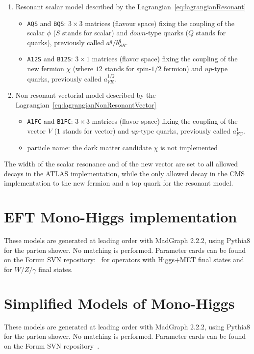 \begin{enumerate}

\item Resonant scalar model described by the Lagrangian~\eqref{eq:lagrangianResonant}
  \begin{itemize}
  \item \texttt{AQS} and \texttt{BQS}: $3\times 3$ matrices (flavour space) fixing the coupling of the scalar $\phi$ ($S$ stands for scalar) and $down$-type quarks ($Q$ stands for quarks), previously called $a^q/b^q_{SR}$.
  \item \texttt{A12S} and \texttt{B12S}: $3\times 1$ matrices (flavor space) fixing the coupling of the new fermion $\chi$ (where $12$ stands for spin-$1/2$ fermion) and $up$-type quarks, previously called $a^{1/2}_{VR}$.
  \end{itemize}  
  
\item Non-resonant vectorial model described by the Lagrangian~\eqref{eq:lagrangianNonResonantVector}
\begin{itemize}
\item \texttt{A1FC} and \texttt{B1FC}: $3\times 3$ matrices (flavor space) fixing the coupling of the vector $V$ ($1$ stands for vector) and $up$-type quarks, previously called $a^1_{FC}$. 
\item particle name: the dark matter candidate $\chi$ is not implemented %
\end{itemize}

\end{enumerate}

The width of the scalar resonance and of the new vector are set to all allowed decays in the ATLAS implementation,
while the only allowed decay in the CMS implementation to the new fermion and a top quark for the resonant model. 

\section{EFT Mono-Higgs implementation}

These models are generated at leading
order with MadGraph 2.2.2, using Pythia8 for the parton shower. No matching is performed. 
Parameter cards can be found on the Forum SVN repository:~\cite{ForumSVN_EWMonoHiggs} for operators with Higgs+MET final states
and ~\cite{ForumSVN_EWEFTD7} for $W/Z/\gamma$ final states.

\section{Simplified Models of Mono-Higgs}

These models are generated at leading
order with MadGraph 2.2.2, using Pythia8 for the parton shower. No matching is performed. 
Parameter cards can be found on the Forum SVN 
repository~\cite{ForumSVN_EWMonoHiggs_2HDM, ForumSVN_EWMonoHiggs}.
